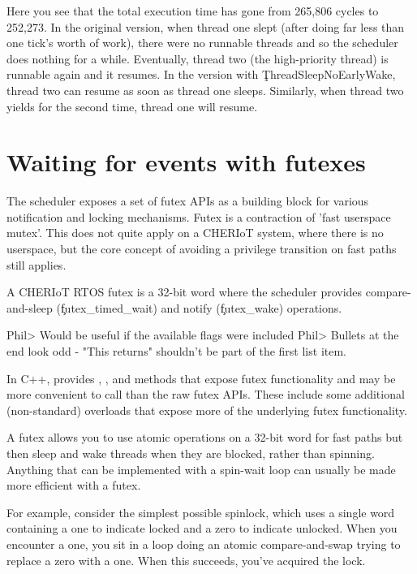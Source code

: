 Here you see that the total execution time has gone from 265,806 cycles to 252,273.
In the original version, when thread one slept (after doing far less than one tick's worth of work), there were no runnable threads and so the scheduler does nothing for a while.
Eventually, thread two (the high-priority thread) is runnable again and it resumes.
In the version with \c{ThreadSleepNoEarlyWake}, thread two can resume as soon as thread one sleeps.
Similarly, when thread two yields for the second time, thread one will resume.

\section[label=futex]{Waiting for events with futexes}

The scheduler exposes a set of futex APIs as a building block for various notification and locking mechanisms.
Futex is a contraction of 'fast userspace mutex'.
This does not quite apply on a CHERIoT system, where there is no userspace, but the core concept of avoiding a privilege transition on fast paths still applies.

A CHERIoT RTOS futex is a 32-bit word where the scheduler provides compare-and-sleep (\c{futex_timed_wait}) and notify (\c{futex_wake}) operations.

Phil> Would be useful if the available flags were included 
Phil> Bullets at the end look odd - "This returns" shouldn't be part of the first list item.  


\begin{note}
	In C++,  provides , , and  methods that expose futex functionality and may be more convenient to call than the raw futex APIs.
	These include some additional (non-standard) overloads that expose more of the underlying futex functionality.
\end{note}

A futex allows you to use atomic operations on a 32-bit word for fast paths but then sleep and wake threads when they are blocked, rather than spinning.
Anything that can be implemented with a spin-wait loop can usually be made more efficient with a futex.

For example, consider the simplest possible spinlock, which uses a single word containing a one to indicate locked and a zero to indicate unlocked.
When you encounter a one, you sit in a loop doing an atomic compare-and-swap trying to replace a zero with a one.
When this succeeds, you've acquired the lock.

